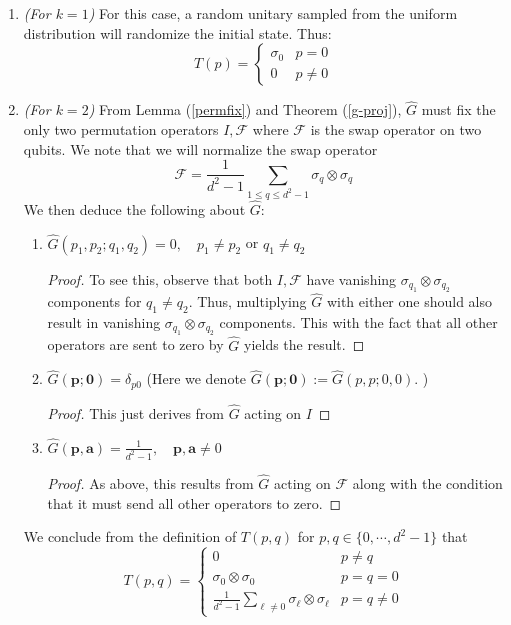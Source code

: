 \documentclass[12pt]{amsart}
\theoremstyle{definition}
\theoremstyle{remark}
\numberwithin{equation}{section}
\theoremstyle{remark}
\begin{document}
\begin{enumerate}
  \item \emph{(For $k = 1$)} For this case, a random unitary sampled from the uniform distribution will randomize the initial state. Thus:
  $$
  T(p) = \begin{cases}
    \sigma_0 & p = 0 \\
    0 & p \neq 0
  \end{cases}
  $$
  \item \emph{(For $k=2$)} From Lemma (\ref{permfix}) and Theorem (\ref{g-proj}), $\widehat{G}$ must fix the only two permutation operators $I, \mathcal{F}$ where $\mathcal{F}$ is the swap operator on two qubits. We note that we will normalize the swap operator
  \begin{equation}
    \mathcal{F} = \frac{1}{d^2 -1 }\sum_{1 \leq q \leq d^2 -1} \sigma_{q} \otimes \sigma_{q}
  \end{equation}
  We then deduce the following about $\widehat{G}$: \newline
    \begin{enumerate}
      \item $\widehat{G}(p_1,p_2;q_1,q_2) = 0, \quad p_1 \neq p_2$ or $q_1 \neq q_2$
      \begin{proof}
        To see this, observe that both $I, \mathcal{F}$ have vanishing $\sigma_{q_1} \otimes \sigma_{q_2}$ components for $q_1 \neq q_2$. Thus, multiplying $\widehat{G}$ with either one should also result in vanishing $\sigma_{q_1} \otimes \sigma_{q_2}$ components. This with the fact that all other operators are sent to zero by $\widehat{G}$ yields the result.
      \end{proof}

      \item $\widehat{G}(\textbf{p};\textbf{0}) = \delta_{p0}$ (Here we denote $\widehat{G}(\textbf{p};\textbf{0}) := \widehat{G}(p,p;0,0)$. )
      \begin{proof}
        This just derives from $\widehat{G}$ acting on $I$
      \end{proof}

      \item $\widehat{G}(\textbf{p},\textbf{a}) = \frac{1}{d^2-1}, \quad \textbf{p},\textbf{a} \neq 0$
      \begin{proof}
        As above, this results from $\widehat{G}$ acting on $\mathcal{F}$ along with the condition that it must send all other operators to zero.
      \end{proof}
    \end{enumerate}
    We conclude from the definition of $T(p,q)$ for $p,q \in \{0,\cdots,d^2-1\}$ that
    \begin{equation} \label{concreteT}
      T(p,q) = \begin{cases}
        0 \quad & p \neq q \\
        \sigma_0 \otimes \sigma_0 & p = q = 0 \\
        \frac{1}{d^2 - 1}\sum_{\ell \neq 0}  \sigma_\ell \otimes \sigma_\ell & p = q \neq 0
      \end{cases}
    \end{equation}
\end{enumerate}
\end{document}

